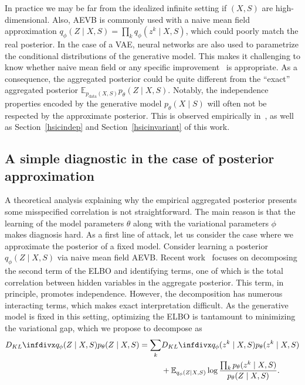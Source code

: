 In practice we may be far from the idealized infinite setting if $(X, S)$ are high-dimensional. Also, AEVB is commonly used with a naive mean field approximation $q_\phi(Z \mid X, S) = \prod_k q_\phi(z^k \mid X, S)$, which could poorly match the real posterior. In the case of a VAE, neural networks are also used to parametrize the conditional distributions of the generative model. This makes it challenging to know whether naive mean field or any specific improvement~\cite{Kingma2016, BurdaGS15} is appropriate. As a consequence, the aggregated posterior could be quite different from the ``exact'' aggregated posterior $\mathbb{E}_{p_\text{data}(X, S)}p_\theta(Z \mid X, S)$. Notably, the independence properties encoded by the generative model $p_\theta(X \mid S)$ will often not be respected by the approximate posterior. This is observed empirically in~\cite{VFAE}, as well as Section~\ref{hsicindep} and Section~\ref{hsicinvariant} of this work.

\subsection{A simple diagnostic in the case of posterior approximation}

A theoretical analysis explaining why the empirical aggregated posterior presents some misspecified correlation is not straightforward. The main reason is that the learning of the model parameters $\theta$ along with the variational parameters $\phi$ makes diagnosis hard. As a first line of attack, let us consider the case where we approximate the posterior of a fixed model. Consider learning a posterior $q_\phi(Z \mid X, S)$ via naive mean field AEVB. Recent work~\cite{Chen2018,Hoffman2016, Makhzani2015} focuses on decomposing the second term of the ELBO and identifying terms, one of which is the total correlation between hidden variables in the aggregate posterior. This term, in principle, promotes independence. However, the decomposition has numerous interacting terms, which makes exact interpretation difficult. As the generative model is fixed in this setting, optimizing the ELBO is tantamount to minimizing the variational gap, which we propose to decompose as
\begin{equation}
\begin{split}
\kld{q_\phi(Z \mid X, S)}{p_\theta(Z\mid X, S)} =  \sum_k &\kld{q_\phi(z^k\mid X, S)}{p_\theta(z^k\mid X, S)} \\
  &+ \mathbb{E}_{q_\phi(Z\mid X, S)}\log\frac{\prod_k p_\theta(z^k\mid X, S) }{p_\theta(Z\mid X, S)}.
\end{split}
\end{equation}

